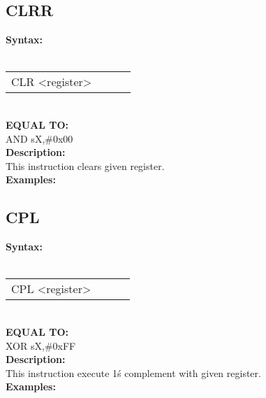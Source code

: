                 \subsection{CLRR}
                \textbf{Syntax:}\\
                \\ {
                    \texttt{}
                    \begin{tabular}[h!]{llll}
                            { \color{highlight_instruction} CLR    } { \color{highlight_symbol} <register> }
                            { \color{highlight_comment}  }\\
                    \end{tabular}
                    }\\
                    \textbf{EQUAL TO:}\\
                    { \color{highlight_instruction} AND    } { \color{highlight_symbol}      sX,\#0x00 }
                    \\
                \textbf{Description:}\\
                This instruction clears given register.\\
                \textbf{Examples:}\\
                        \begin{code}[h!]
                            symbol}\verb'CLR          s0' }\\
                        \end{code}
                \subsection{CPL}
                \textbf{Syntax:}\\
                \\ {
                    \texttt{}
                    \begin{tabular}[h!]{llll}
                            { \color{highlight_instruction} CPL    } { \color{highlight_symbol} <register> }
                            { \color{highlight_comment}  }\\
                    \end{tabular}
                    }\\
                    \textbf{EQUAL TO:}\\
                    { \color{highlight_instruction} XOR    } { \color{highlight_symbol}      sX,\#0xFF }
                    \\
                \textbf{Description:}\\
                This instruction execute 1\'s complement with given register.\\
                \textbf{Examples:}\\
                        \begin{code}[h!]
                            symbol}\verb'CPL          s0' }\\
                        \end{code}
